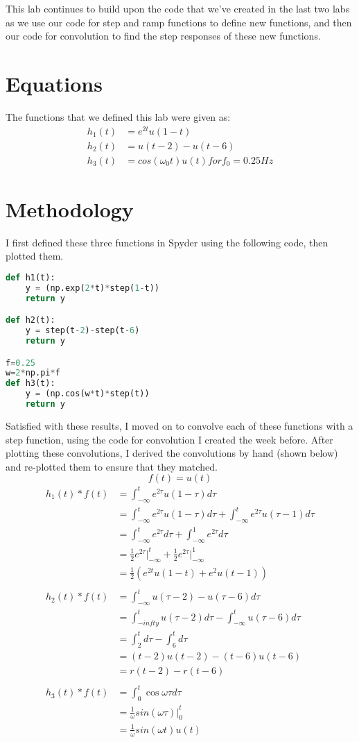 \documentclass[12pt]{report}
\begin{document}
This lab continues to build upon the code that we've created in the last two labs as we use our code for step and ramp functions to define new functions, and then our code for convolution to find the step responses of these new functions. 
\section{Equations}

The functions that we defined this lab were given as:
\begin{align*}
    h_1(t) &= e^{2t}u(1-t) \\
    h_2(t) &= u(t-2)-u(t-6) \\
    h_3(t) &= cos(\omega_0t)u(t) for f_0 = 0.25Hz 
\end{align*}

 \section{Methodology}
 
 I first defined these three functions in Spyder using the following code, then plotted them.
 \begin{lstlisting}[language=Python]
 def h1(t):
    y = (np.exp(2*t)*step(1-t))
    return y

def h2(t):
    y = step(t-2)-step(t-6)
    return y

f=0.25
w=2*np.pi*f
def h3(t):
    y = (np.cos(w*t)*step(t))
    return y
\end{lstlisting}
Satisfied with these results, I moved on to convolve each of these functions with a step function, using the code for convolution I created the week before. After plotting these convolutions, I derived the convolutions by hand (shown below) and re-plotted them to ensure that they matched. 
\newpage
$$ f(t) = u(t)$$
\begin{align*}
h_1(t)*f(t) &= \int_{-\infty}^{t} e^{2\tau} u(1-\tau)d\tau \\
&= \int_{-\infty}^{t} e^{2\tau} u(1-\tau) d\tau + \int_{-\infty}^{t} e^{2\tau} u(\tau-1) d\tau \\
&= \int_{-\infty}^{t} e^{2\tau} d\tau + \int_{-\infty}^{1} e^{2\tau} d\tau \\
&= \tfrac{1}{2} e^{2\tau} \Big|_{-\infty}^{t} + \tfrac{1}{2} e^{2\tau} \Big|_{-\infty}^{1} \\
&= \frac{1}{2} \left(e^{2t}u(1-t) + e^2u(t-1) \right) \\
\\
h_2(t)*f(t) &= \int_{-\infty}^{t} u(\tau-2)-u(\tau-6) d\tau \\
&= \int_{-infty}^{t} u(\tau-2) d\tau - \int_{-\infty}^{t} u(\tau-6) d\tau \\
&= \int_{2}^{t} d\tau - \int_{6}^{t} d\tau \\
&= (t-2)u(t-2)-(t-6)u(t-6) \\
&= r(t-2)-r(t-6) \\
\\
h_3(t)*f(t) &= \int_{0}^{t} \cos{\omega\tau} d\tau \\
&= \frac{1}{\omega} sin(\omega\tau) \Big|_{0}^{t} \\
&= \frac{1}{\omega}sin(\omega t)u(t)
\end{align*}
 
\end{document}
